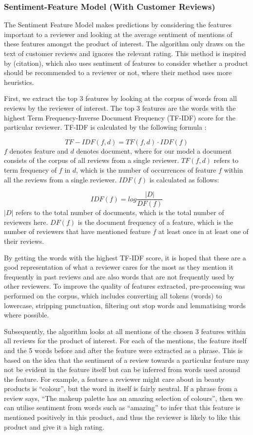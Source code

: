 \documentclass[sigconf,authorversion,nonacm]{acmart}
\begin{document}
\subsubsection{Sentiment-Feature Model (With Customer Reviews)}

    The Sentiment Feature Model makes predictions by considering the features important to a reviewer and looking at the average sentiment of mentions of these features amongst the product of interest. The algorithm only draws on the text of customer reviews and ignores the relevant rating. This method is inspired by (citation), which also uses sentiment of features to consider whether a product should be recommended to a reviewer or not, where their method uses more heuristics. 

    First, we extract the top 3 features by looking at the corpus of words from all reviews by the reviewer of interest. The top 3 features are the words with the highest Term Frequency-Inverse Document Frequency (TF-IDF) score for the particular reviewer. TF-IDF is calculated by the following formula \cite{joachims1996probabilistic}: 

    $$ TF-IDF(f, d) = TF(f,d) \cdot IDF(f) $$
    $f$ denotes feature and $d$ denotes document, where for our model a document consists of the corpus of all reviews from a single reviewer. $TF(f,d)$ refers to term frequency of $f$ in $d$, which is the number of occurrences of feature $f$ within all the reviews from a single reviewer. $IDF(f)$ is calculated as follows: 
    
    $$ IDF(f) = log \frac{|D|}{DF(f)}$$
    $|D|$ refers to the total number of documents, which is the total number of reviewers here. $DF(f)$ is the document frequency of a feature, which is the number of reviewers that have mentioned feature $f$ at least once in at least one of their reviews. 
    
    By getting the words with the highest TF-IDF score, it is hoped that these are a good representation of what a reviewer cares for the most as they mention it frequently in past reviews and are also words that are not frequently used by other reviewers. To improve the quality of features extracted, pre-processing was performed on the corpus, which includes converting all tokens (words) to lowercase, stripping punctuation, filtering out stop words and lemmatising words where possible. 

    Subsequently, the algorithm looks at all mentions of the chosen 3 features within all reviews for the product of interest. For each of the mentions, the feature itself and the 5 words before and after the feature were extracted as a phrase. This is based on the idea that the sentiment of a review towards a particular feature may not be evident in the feature itself but can be inferred from words used around the feature. For example, a feature a reviewer might care about in beauty products is “colour”, but the word in itself is fairly neutral. If a phrase from a review says, “The makeup palette has an amazing selection of colours”, then we can utilise sentiment from words such as “amazing” to infer that this feature is mentioned positively in this product, and thus the reviewer is likely to like this product and give it a high rating. 
\end{document}
